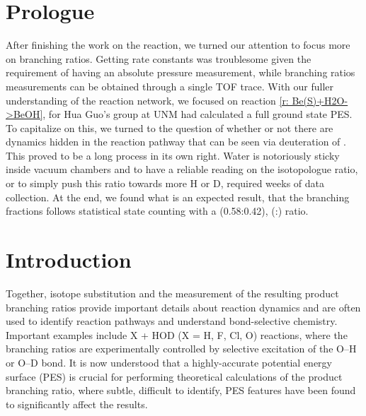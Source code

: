 \section{Prologue}

After finishing the work on the  reaction, we turned our attention to focus more on branching ratios. Getting rate constants was troublesome given the requirement of having an absolute pressure measurement, while branching ratios measurements can be obtained through a single TOF trace. With our fuller understanding of the  reaction network, we focused on reaction \ref{r: Be(S)+H2O->BeOH}, for Hua Guo's group at UNM had calculated a full ground state PES. To capitalize on this, we turned to the question of whether or not there are dynamics hidden in the reaction pathway that can be seen via deuteration of . This proved to be a long process in its own right. Water is notoriously sticky inside vacuum chambers and to have a reliable reading on the isotopologue ratio, or to simply push this ratio towards more H or D, required weeks of data collection. At the end, we found what is an expected result, that the branching fractions follows statistical state counting with a (0.58:0.42), (:) ratio.

\section{Introduction}

Together, isotope substitution and the measurement of the resulting product branching ratios provide important details about reaction dynamics and are often used to identify reaction pathways and understand bond-selective chemistry.\cite{Crim1990,Crim1996,Zare1998} Important examples include X + HOD (X = H, F, Cl, O) reactions, where the branching ratios are experimentally controlled by selective excitation of the O–H or O–D bond.\cite{Sinha1990,Bronikowski1991,Metz1993a,Zhang1997,Song2015,Song2015a,Fu2015,Zheng2018a,Skouteris1999b} It is now understood that a highly-accurate potential energy surface (PES) is crucial for performing theoretical calculations of the product branching ratio, where subtle, difficult to identify, PES features have been found to significantly affect the results.\cite{Skouteris1999b}

